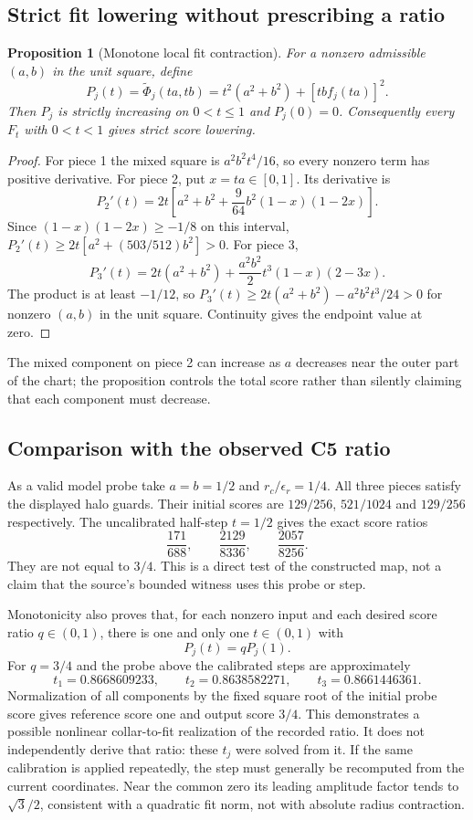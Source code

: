 \documentclass[11pt,a4paper]{article}
\newtheorem{proposition}{Proposition}
\begin{document}
\subsection{Strict fit lowering without prescribing a ratio}
\begin{proposition}[Monotone local fit contraction]
For a nonzero admissible $(a,b)$ in the unit square, define
\[
P_j(t)=\widetilde\Phi_j(ta,tb)
=t^2(a^2+b^2)+[tb f_j(ta)]^2.
\]
Then $P_j$ is strictly increasing on $0<t\le1$ and $P_j(0)=0$.
Consequently every $F_t$ with $0<t<1$ gives strict score lowering.
\end{proposition}
\begin{proof}
For piece 1 the mixed square is $a^2b^2t^4/16$, so every nonzero term
has positive derivative. For piece 2, put $x=ta\in[0,1]$. Its derivative is
\[
P_2'(t)=2t\left[a^2+b^2+\frac{9}{64}b^2(1-x)(1-2x)\right].
\]
Since $(1-x)(1-2x)\ge-1/8$ on this interval,
$P_2'(t)\ge2t[a^2+(503/512)b^2]>0$.
For piece 3,
\[
P_3'(t)=2t(a^2+b^2)
+\frac{a^2b^2}{2}t^3(1-x)(2-3x).
\]
The product is at least $-1/12$, so
$P_3'(t)\ge2t(a^2+b^2)-a^2b^2t^3/24>0$ for nonzero $(a,b)$
in the unit square. Continuity gives the endpoint value at zero.
\end{proof}
The mixed component on piece 2 can increase as $a$ decreases near the
outer part of the chart; the proposition controls the total score rather
than silently claiming that each component must decrease.

\subsection{Comparison with the observed C5 ratio}
As a valid model probe take $a=b=1/2$ and $r_c/\epsilon_r=1/4$.
All three pieces satisfy the displayed halo guards. Their initial scores are
$129/256$, $521/1024$ and $129/256$ respectively. The uncalibrated half-step
$t=1/2$ gives the exact score ratios
\[
\frac{171}{688},\qquad\frac{2129}{8336},\qquad\frac{2057}{8256}.
\]
They are not equal to $3/4$. This is a direct test of the constructed map,
not a claim that the source's bounded witness uses this probe or step.

Monotonicity also proves that, for each nonzero input and each desired
score ratio $q\in(0,1)$, there is one and only one $t\in(0,1)$ with
\[
P_j(t)=qP_j(1).
\]
For $q=3/4$ and the probe above the calibrated steps are approximately
\[
t_1=0.8668609233,\qquad t_2=0.8638582271,\qquad t_3=0.8661446361.
\]
Normalization of all components by the fixed square root of the initial
probe score gives reference score one and output score $3/4$.
This demonstrates a possible nonlinear collar-to-fit realization of the
recorded ratio. It does not independently derive that ratio: these $t_j$
were solved from it. If the same calibration is applied repeatedly, the
step must generally be recomputed from the current coordinates.
Near the common zero its leading amplitude factor tends to $\sqrt3/2$,
consistent with a quadratic fit norm, not with absolute radius contraction.
\end{document}
